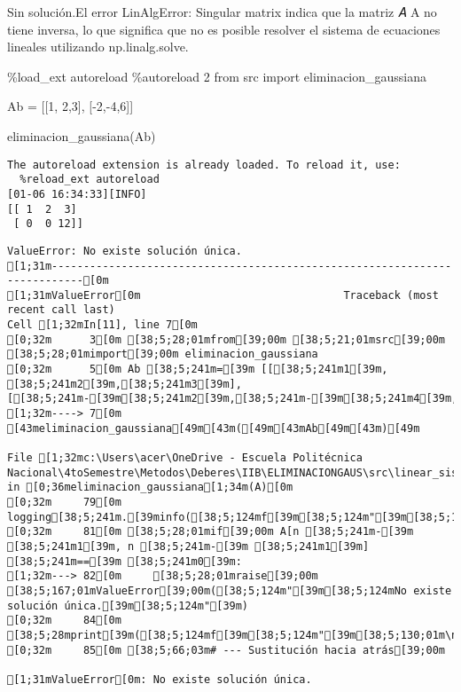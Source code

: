 \documentclass[
  letterpaper,
  DIV=11,
  numbers=noendperiod]{scrartcl}
\newenvironment{Shaded}{\begin{snugshade}}{\end{snugshade}}
\newcommand{\DecValTok}[1]{\textcolor[rgb]{0.68,0.00,0.00}{#1}}
\newcommand{\ImportTok}[1]{\textcolor[rgb]{0.00,0.46,0.62}{#1}}
\newcommand{\NormalTok}[1]{\textcolor[rgb]{0.00,0.23,0.31}{#1}}
\newcommand{\OperatorTok}[1]{\textcolor[rgb]{0.37,0.37,0.37}{#1}}
\begin{document}
Sin solución.El error LinAlgError: Singular matrix indica que la matriz
𝐴 A no tiene inversa, lo que significa que no es posible resolver el
sistema de ecuaciones lineales utilizando np.linalg.solve.

\begin{Shaded}
\begin{Highlighting}[]
\OperatorTok{\%}\NormalTok{load\_ext autoreload}
\OperatorTok{\%}\NormalTok{autoreload }\DecValTok{2}
\ImportTok{from}\NormalTok{ src }\ImportTok{import}\NormalTok{ eliminacion\_gaussiana}

\NormalTok{Ab }\OperatorTok{=}\NormalTok{ [[}\DecValTok{1}\NormalTok{, }\DecValTok{2}\NormalTok{,}\DecValTok{3}\NormalTok{], [}\OperatorTok{{-}}\DecValTok{2}\NormalTok{,}\OperatorTok{{-}}\DecValTok{4}\NormalTok{,}\DecValTok{6}\NormalTok{]]}

\NormalTok{eliminacion\_gaussiana(Ab)}
\end{Highlighting}
\end{Shaded}

\begin{verbatim}
The autoreload extension is already loaded. To reload it, use:
  %reload_ext autoreload
[01-06 16:34:33][INFO] 
[[ 1  2  3]
 [ 0  0 12]]
\end{verbatim}

\begin{verbatim}
ValueError: No existe solución única.
[1;31m---------------------------------------------------------------------------[0m
[1;31mValueError[0m                                Traceback (most recent call last)
Cell [1;32mIn[11], line 7[0m
[0;32m      3[0m [38;5;28;01mfrom[39;00m [38;5;21;01msrc[39;00m [38;5;28;01mimport[39;00m eliminacion_gaussiana
[0;32m      5[0m Ab [38;5;241m=[39m [[[38;5;241m1[39m, [38;5;241m2[39m,[38;5;241m3[39m], [[38;5;241m-[39m[38;5;241m2[39m,[38;5;241m-[39m[38;5;241m4[39m,[38;5;241m6[39m]]
[1;32m----> 7[0m [43meliminacion_gaussiana[49m[43m([49m[43mAb[49m[43m)[49m

File [1;32mc:\Users\acer\OneDrive - Escuela Politécnica Nacional\4toSemestre\Metodos\Deberes\IIB\ELIMINACIONGAUS\src\linear_sist_methods.py:82[0m, in [0;36meliminacion_gaussiana[1;34m(A)[0m
[0;32m     79[0m     logging[38;5;241m.[39minfo([38;5;124mf[39m[38;5;124m"[39m[38;5;130;01m\n[39;00m[38;5;132;01m{[39;00mA[38;5;132;01m}[39;00m[38;5;124m"[39m)
[0;32m     81[0m [38;5;28;01mif[39;00m A[n [38;5;241m-[39m [38;5;241m1[39m, n [38;5;241m-[39m [38;5;241m1[39m] [38;5;241m==[39m [38;5;241m0[39m:
[1;32m---> 82[0m     [38;5;28;01mraise[39;00m [38;5;167;01mValueError[39;00m([38;5;124m"[39m[38;5;124mNo existe solución única.[39m[38;5;124m"[39m)
[0;32m     84[0m     [38;5;28mprint[39m([38;5;124mf[39m[38;5;124m"[39m[38;5;130;01m\n[39;00m[38;5;132;01m{[39;00mA[38;5;132;01m}[39;00m[38;5;124m"[39m)
[0;32m     85[0m [38;5;66;03m# --- Sustitución hacia atrás[39;00m

[1;31mValueError[0m: No existe solución única.
\end{verbatim}
\end{document}
